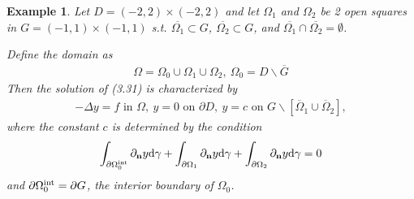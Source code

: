 \documentclass{book}
\numberwithin{equation}{section}
\newtheorem{example}{Example}[section]
\begin{document}
\begin{enumerate}
    \begin{example}
        Let $D = (-2,2)\times(-2,2)$ and let $\Omega_1$ and $\Omega_2$ be 2 open squares in $G = (-1,1)\times(-1,1)$ s.t. $\overline{\Omega_1}\subset G$, $\overline{\Omega_2}\subset G$, and $\overline{\Omega_1}\cap\overline{\Omega_2} = \emptyset$.
        
        Define the domain as
        \begin{align*}
            \Omega = \Omega_0\cup\Omega_1\cup\Omega_2,\ \Omega_0 = D\backslash\overline{G}
        \end{align*}
        Then the solution of (3.31) is characterized by
        \begin{align*}
            -\Delta y = f \mbox{ in } \Omega,\ y = 0 \mbox{ on } \partial D,\ y = c \mbox{ on } G\backslash[\overline{\Omega}_1\cup\overline{\Omega}_2],
        \end{align*}
        where the constant $c$ is determined by the condition
        \begin{align*}
            \int_{\partial\Omega_0^{\rm int}} \partial_{\bf n}y{\rm d}\gamma + \int_{\partial\Omega_1} \partial_{\bf n}y{\rm d}\gamma + \int_{\partial\Omega_2} \partial_{\bf n}y{\rm d}\gamma = 0
        \end{align*}
        and $\partial\Omega_0^{\rm int} = \partial G$, the interior boundary of $\Omega_0$.
    \end{example}
\end{enumerate}
\end{document}
